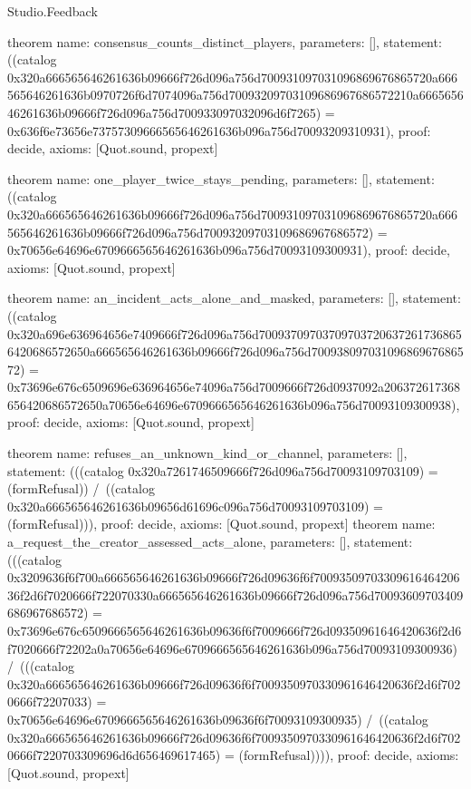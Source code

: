 \begin{lexlean}{Studio.Feedback}
\begin{semanticmodule}
theorem{
  name: consensus_counts_distinct_players,
  parameters: [],
  statement: ((catalog 0x320a666565646261636b09666f726d096a756d700931097031096869676865720a666565646261636b0970726f6d7074096a756d70093209703109686967686572210a666565646261636b09666f726d096a756d700933097032096d6f7265) = 0x636f6e73656e73757309666565646261636b096a756d70093209310931),
  proof: decide{},
  axioms: [Quot.sound, propext]
}

theorem{
  name: one_player_twice_stays_pending,
  parameters: [],
  statement: ((catalog 0x320a666565646261636b09666f726d096a756d700931097031096869676865720a666565646261636b09666f726d096a756d70093209703109686967686572) = 0x70656e64696e6709666565646261636b096a756d70093109300931),
  proof: decide{},
  axioms: [Quot.sound, propext]
}

theorem{
  name: an_incident_acts_alone_and_masked,
  parameters: [],
  statement: ((catalog 0x320a696e636964656e7409666f726d096a756d700937097037097037206372617368656420686572650a666565646261636b09666f726d096a756d70093809703109686967686572) = 0x73696e676c6509696e636964656e74096a756d7009666f726d0937092a206372617368656420686572650a70656e64696e6709666565646261636b096a756d70093109300938),
  proof: decide{},
  axioms: [Quot.sound, propext]
}

theorem{
  name: refuses_an_unknown_kind_or_channel,
  parameters: [],
  statement: (((catalog 0x320a7261746509666f726d096a756d70093109703109) = (formRefusal)) /\ ((catalog 0x320a666565646261636b09656d61696c096a756d70093109703109) = (formRefusal))),
  proof: decide{},
  axioms: [Quot.sound, propext]
}
theorem{
  name: a_request_the_creator_assessed_acts_alone,
  parameters: [],
  statement: (((catalog 0x3209636f6f700a666565646261636b09666f726d09636f6f7009350970330961646420636f2d6f7020666f722070330a666565646261636b09666f726d096a756d70093609703409686967686572) = 0x73696e676c6509666565646261636b09636f6f7009666f726d09350961646420636f2d6f7020666f72202a0a70656e64696e6709666565646261636b096a756d70093109300936) /\ (((catalog 0x320a666565646261636b09666f726d09636f6f7009350970330961646420636f2d6f7020666f72207033) = 0x70656e64696e6709666565646261636b09636f6f70093109300935) /\ ((catalog 0x320a666565646261636b09666f726d09636f6f7009350970330961646420636f2d6f7020666f7220703309696d6d656469617465) = (formRefusal)))),
  proof: decide{},
  axioms: [Quot.sound, propext]
}
\end{semanticmodule}
\end{lexlean}
